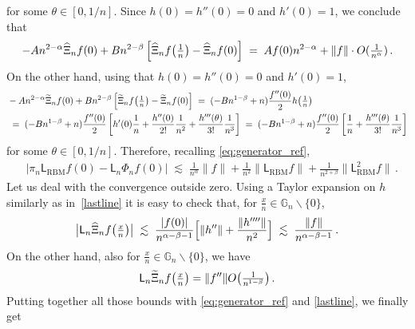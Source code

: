 \documentclass[12pt,a4paper]{article}
\theoremstyle{plain}
\theoremstyle{remark}
\newcommand{\msf}[1]{{\mathsf #1}}
\newcommand{\bb}[1]{{\mathbb #1}}
\newcommand{\norm}[1]{\lVert#1\rVert}
\newcommand{\pfrac}[2]{\genfrac{}{}{}{1}{#1}{#2}}
\newcommand{\pn}[1]{\big(\pfrac{#1}{n}\big)}
\begin{document}
	for some $\theta \in [0,1/n]$. Since $h(0) = h''(0) = 0$ and $h'(0)=1$, we conclude that
	\begin{equation*}
		\begin{aligned}
			- An^{2-\alpha }\widehat{\Xi}_nf(0)	+Bn^{2-\beta}\left[\widehat{\Xi}_nf\pn{1} - \widehat{\Xi}_nf(0)\right]\;=\;A f(0)n^{2-\alpha} + \norm{f}\cdot O(\pfrac{1}{n^\alpha})\,.
		\end{aligned}
	\end{equation*}
	On the other hand, using that $h(0)= h''(0)=0$ and $h'(0)=1$,
	\begin{equation*}
		\begin{aligned}
			&- An^{2-\alpha }\widetilde{\Xi}_nf(0)	+Bn^{2-\beta}\left[\widetilde{\Xi}_nf\pn{1} - \widetilde{\Xi}_nf(0)\right]
			\;=\; (-Bn^{1-\beta} + n)\frac{f''(0)}{2}h\pn{1}\\
			&\;=\;  (-Bn^{1-\beta} + n)\frac{f''(0)}{2} \left[h'(0)\frac{1}{n} + \frac{h''(0)}{2!}\frac{1}{n^2}+  \frac{h'''(\theta)}{3!}\frac{1}{n^3}\right]\;=\; 
			(-Bn^{1-\beta} + n)\frac{f''(0)}{2} \left[\frac{1}{n} +\frac{h'''(\theta)}{3!}\frac{1}{n^3}\right]
		\end{aligned}
	\end{equation*}
	for some $\theta \in [0,1/n]$.
	Therefore, recalling \eqref{eq:generator_ref},
	\begin{equation*}
		\begin{aligned}
			& |\pi_n\msf{L}_{\text{RBM}}f(0)-\msf{L}_n\Phi_nf(0)|
			\;\lesssim\; \frac{1}{n^\alpha}\|f\|+\frac{1}{n^2}\|\msf{L}_{\text{RBM}}f\|+\frac{1}{n^{2+\beta}}\|\msf{L}^2_{\text{RBM}}f\|\,.
		\end{aligned}
	\end{equation*}
	Let us deal with the convergence outside zero. Using a Taylor expansion on $h$  similarly as in~\eqref{lastline} it is easy to check that, for $\frac{x}{n} \in \bb{G}_n \backslash\{0\}$,
	\begin{align*}
		\big\vert \msf{L}_n\widehat{\Xi}_nf\pn{x}\big\vert \;\lesssim\; \frac{|f(0)|}{n^{\alpha - \beta-1}}\Big[\norm{h''} +  \frac{\norm{h''''}}{n^{2}}\Big] \;\lesssim\; \frac{\|f\|}{n^{\alpha-\beta-1}}\,.
	\end{align*}
	On the other hand, also for  $\frac{x}{n} \in \bb{G}_n \backslash\{0\}$, we have
	\begin{align*}
		\msf{L}_n\widetilde{\Xi}_nf\pn{x}=\norm{f''}O\big(\pfrac{1}{n^{1-\beta}}\big)\,.
	\end{align*}
	Putting together all those bounds with \eqref{eq:generator_ref} and \eqref{lastline}, we finally get
\end{document}
